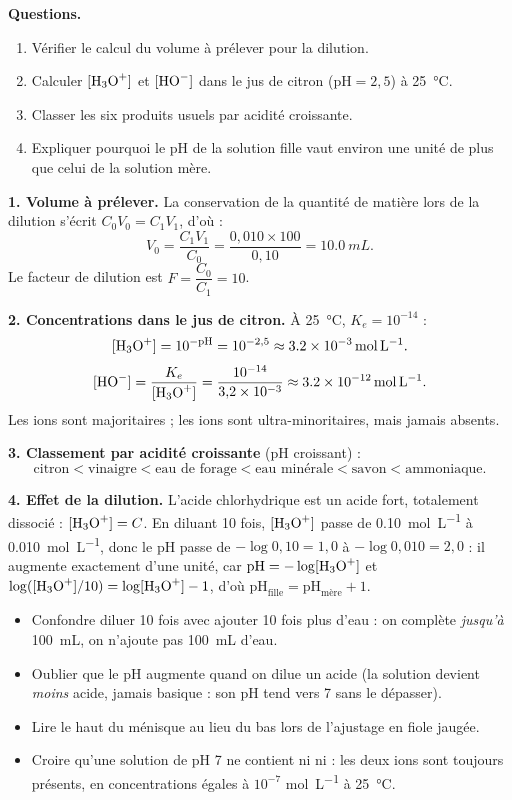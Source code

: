 \documentclass[11pt]{article}
\begin{document}
\begin{exoresolu}
\textbf{Questions.}
\begin{enumerate}
\item Vérifier le calcul du volume à prélever pour la dilution.
\item Calculer $[\ce{H3O+}]$ et $[\ce{HO-}]$ dans le jus de citron ($\mathrm{pH} = 2{,}5$) à \SI{25}{\celsius}.
\item Classer les six produits usuels par acidité croissante.
\item Expliquer pourquoi le pH de la solution fille vaut environ une unité de plus que celui de la solution mère.
\end{enumerate}
\tcblower
\textbf{1. Volume à prélever.} La conservation de la quantité de matière lors de la dilution s'écrit $C_0 V_0 = C_1 V_1$, d'où :
\[ V_0 = \frac{C_1 V_1}{C_0} = \frac{0{,}010 \times 100}{0{,}10} = \SI{10,0}{mL}. \]
Le facteur de dilution est $F = \dfrac{C_0}{C_1} = 10$.

\textbf{2. Concentrations dans le jus de citron.} À \SI{25}{\celsius}, $K_e = 10^{-14}$ :
\[ [\ce{H3O+}] = 10^{-\mathrm{pH}} = 10^{-2{,}5} \approx \SI{3,2e-3}{mol.L^{-1}}. \]
\[ [\ce{HO-}] = \frac{K_e}{[\ce{H3O+}]} = \frac{10^{-14}}{3{,}2 \times 10^{-3}} \approx \SI{3,2e-12}{mol.L^{-1}}. \]
Les ions  sont majoritaires ; les ions  sont ultra-minoritaires, mais jamais absents.

\textbf{3. Classement par acidité croissante} (pH croissant) :
\[ \text{citron} < \text{vinaigre} < \text{eau de forage} < \text{eau minérale} < \text{savon} < \text{ammoniaque}. \]

\textbf{4. Effet de la dilution.} L'acide chlorhydrique est un acide fort, totalement dissocié : $[\ce{H3O+}] = C$. En diluant 10 fois, $[\ce{H3O+}]$ passe de \SI{0,10}{mol.L^{-1}} à \SI{0,010}{mol.L^{-1}}, donc le pH passe de $-\log 0{,}10 = 1{,}0$ à $-\log 0{,}010 = 2{,}0$ : il augmente exactement d'une unité, car $\mathrm{pH} = -\log[\ce{H3O+}]$ et $\log([\ce{H3O+}]/10) = \log[\ce{H3O+}] - 1$, d'où $\mathrm{pH}_{\text{fille}} = \mathrm{pH}_{\text{mère}} + 1$.
\end{exoresolu}

\begin{attention}
\begin{itemize}
\item Confondre \og diluer 10 fois \fg{} avec \og ajouter 10 fois plus d'eau \fg{} : on complète \emph{jusqu'à} \SI{100}{mL}, on n'ajoute pas \SI{100}{mL} d'eau.
\item Oublier que le pH augmente quand on dilue un acide (la solution devient \emph{moins} acide, jamais basique : son pH tend vers 7 sans le dépasser).
\item Lire le haut du ménisque au lieu du bas lors de l'ajustage en fiole jaugée.
\item Croire qu'une solution de pH 7 ne contient ni  ni  : les deux ions sont toujours présents, en concentrations égales à $10^{-7}$ \si{mol.L^{-1}} à \SI{25}{\celsius}.
\end{itemize}
\end{attention}
\end{document}
